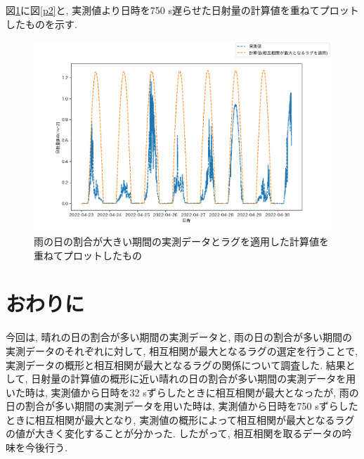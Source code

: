 \documentclass[a4j,12pt,]{jarticle}
\begin{document}
図\ref{p4}に図\ref{p2}と, 実測値より日時を750 \si{\second}遅らせた日射量の計算値を重ねてプロットしたものを示す.

\begin{figure}[H]
  \begin{center}
    \includegraphics[width=160mm]{4.png}
    \caption{雨の日の割合が大きい期間の実測データとラグを適用した計算値を重ねてプロットしたもの}
    \label{p4}
  \end{center}
\end{figure}

\section{おわりに}
今回は, 晴れの日の割合が多い期間の実測データと, 雨の日の割合が多い期間の実測データのそれぞれに対して, 相互相関が最大となるラグの選定を行うことで, 実測データの概形と相互相関が最大となるラグの関係について調査した.
結果として, 日射量の計算値の概形に近い晴れの日の割合が多い期間の実測データを用いた時は, 実測値から日時を32 \si{\second}ずらしたときに相互相関が最大となったが, 雨の日の割合が多い期間の実測データを用いた時は, 実測値から日時を750 \si{\second}ずらしたときに相互相関が最大となり, 実測値の概形によって相互相関が最大となるラグの値が大きく変化することが分かった.
したがって, 相互相関を取るデータの吟味を今後行う.
\end{document}
